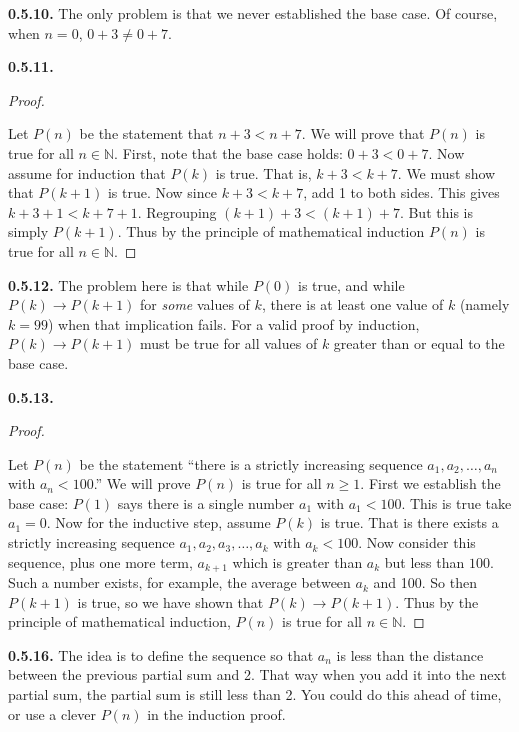\documentclass[12pt,]{book}
\theoremstyle{plain}
\theoremstyle{definition}
\theoremstyle{definition}
\theoremstyle{definition}
\numberwithin{equation}{chapter}
\newcommand{\N}{\mathbb N}
\newcommand{\imp}{\rightarrow}
\newcommand{\lt}{<}
\begin{document}
\par\smallskip
\noindent\textbf{0.5.10.} \hypertarget{p-473}{}%
The only problem is that we never established the base case. Of course, when \(n = 0\), \(0+3 \ne 0+7\).%
\par\smallskip
\noindent\textbf{0.5.11.} \begin{proof}\hypertarget{proof-14}{}
\hypertarget{p-475}{}%
Let \(P(n)\) be the statement that \(n + 3 \lt  n + 7\). We will prove that \(P(n)\) is true for all \(n \in \N\). First, note that the base case holds: \(0+3 \lt  0+7\). Now assume for induction that \(P(k)\) is true. That is, \(k+3 \lt  k+7\). We must show that \(P(k+1)\) is true. Now since \(k + 3 \lt  k + 7\), add 1 to both sides. This gives \(k + 3 + 1 \lt  k + 7 + 1\). Regrouping \((k+1) + 3 \lt  (k+1) + 7\). But this is simply \(P(k+1)\). Thus by the principle of mathematical induction \(P(n)\) is true for all \(n \in \N\).%
\end{proof}
\par\smallskip
\noindent\textbf{0.5.12.} \hypertarget{p-478}{}%
The problem here is that while \(P(0)\) is true, and while \(P(k) \imp P(k+1)\) for \emph{some} values of \(k\), there is at least one value of \(k\) (namely \(k = 99\)) when that implication fails. For a valid proof by induction, \(P(k) \imp P(k+1)\) must be true for all values of \(k\) greater than or equal to the base case.%
\par\smallskip
\noindent\textbf{0.5.13.} \begin{proof}\hypertarget{proof-16}{}
\hypertarget{p-480}{}%
Let \(P(n)\) be the statement ``there is a strictly increasing sequence \(a_1, a_2, \ldots, a_n\) with \(a_n \lt  100\).'' We will prove \(P(n)\) is true for all \(n \ge 1\). First we establish the base case: \(P(1)\) says there is a single number \(a_1\) with \(a_1 \lt  100\). This is true \textendash{} take \(a_1 = 0\). Now for the inductive step, assume \(P(k)\) is true. That is there exists a strictly increasing sequence \(a_1, a_2, a_3, \ldots, a_k\) with \(a_k \lt  100\). Now consider this sequence, plus one more term, \(a_{k+1}\) which is greater than \(a_k\) but less than \(100\). Such a number exists, for example, the average between \(a_k\) and 100. So then \(P(k+1)\) is true, so we have shown that \(P(k) \imp P(k+1)\). Thus by the principle of mathematical induction, \(P(n)\) is true for all \(n \in \N\).%
\end{proof}
\par\smallskip
\noindent\textbf{0.5.16.} \hypertarget{p-485}{}%
The idea is to define the sequence so that \(a_n\) is less than the distance between the previous partial sum and 2. That way when you add it into the next partial sum, the partial sum is still less than 2. You could do this ahead of time, or use a clever \(P(n)\) in the induction proof.%
\end{document}

